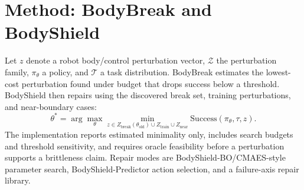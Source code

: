 \section{Method: BodyBreak and BodyShield}

Let \(z\) denote a robot body/control perturbation vector, \(\mathcal{Z}\)
the perturbation family, \(\pi_\theta\) a policy, and \(\mathcal{T}\) a task
distribution. BodyBreak estimates the lowest-cost perturbation found under
budget that drops success below a threshold. BodyShield then repairs using
the discovered break set, training perturbations, and near-boundary cases:
\[
\theta^*=\arg\max_\theta \min_{z\in Z_{\mathrm{break}}(\theta_{\mathrm{old}})
\cup Z_{\mathrm{train}}\cup Z_{\mathrm{near}}} \mathrm{Success}(\pi_\theta,\tau,z).
\]
The implementation reports estimated minimality only, includes search budgets
and threshold sensitivity, and requires oracle feasibility before a perturbation
supports a brittleness claim. Repair modes are BodyShield-BO/CMAES-style
parameter search, BodyShield-Predictor action selection, and a failure-axis
repair library.
